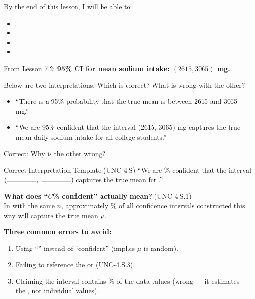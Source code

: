 \documentclass[10pt]{article}
\begin{document}
\namedateperiod

\begin{objectivebox}
By the end of this lesson, I will be able to:
\begin{itemize}
    \item[$\square$] \writeline
    \item[$\square$] \writeline
    \item[$\square$] \writeline
    \item[$\square$] \writeline
\end{itemize}
\end{objectivebox}

\begin{vocabbox}
\end{vocabbox}

\begin{hookbox}
From Lesson 7.2: \textbf{95\% CI for mean sodium intake: $(2615, 3065)$ mg.}

Below are two interpretations. Which is correct? What is wrong with the other?

\begin{itemize}
    \item[A.] ``There is a 95\% probability that the true mean is between 2615 and 3065 mg.''
    \item[B.] ``We are 95\% confident that the interval (2615, 3065) mg captures
              the true mean daily sodium intake for all college students.''
\end{itemize}

Correct: \blank{2cm} \quad Why is the other wrong? 
\end{hookbox}

\begin{notesbox}{Correct Interpretation Template (UNC-4.S)}
``We are \blank{2cm}\% confident that the interval
$(\rule{1.5cm}{0.4pt},\ \rule{1.5cm}{0.4pt})$ \blank{2cm}
captures the true mean \blank{4cm} for \blank{4cm}.''

\vspace{0.1in}
\textbf{What does ``$C$\% confident'' actually mean?} (UNC-4.S.1)\\
In \blank{8cm} with the same $n$, approximately \blank{2cm}\% of
all confidence intervals constructed this way will capture the true mean $\mu$.

\vspace{0.1in}
\textbf{Three common errors to avoid:}
\begin{enumerate}
    \item Using ``\blank{4cm}'' instead of ``confident'' (implies $\mu$ is random).
    \item Failing to reference the \blank{4cm} or \blank{4cm} (UNC-4.S.3).
    \item Claiming the interval contains \blank{4cm}\% of the data values (wrong ---
          it estimates the \blank{4cm}, not individual values).
\end{enumerate}
\end{notesbox}
\end{document}
